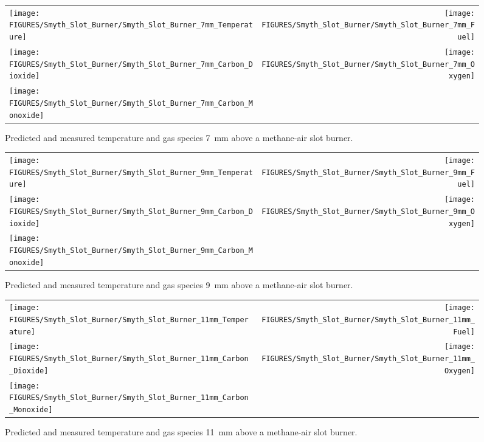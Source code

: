 \begin{figure}[p]
\begin{tabular*}{\textwidth}{l@{\extracolsep{\fill}}r}
\texttt{[image: FIGURES/Smyth\_Slot\_Burner/Smyth\_Slot\_Burner\_7mm\_Temperature]} &
\texttt{[image: FIGURES/Smyth\_Slot\_Burner/Smyth\_Slot\_Burner\_7mm\_Fuel]} \\
\texttt{[image: FIGURES/Smyth\_Slot\_Burner/Smyth\_Slot\_Burner\_7mm\_Carbon\_Dioxide]} &
\texttt{[image: FIGURES/Smyth\_Slot\_Burner/Smyth\_Slot\_Burner\_7mm\_Oxygen]} \\
\texttt{[image: FIGURES/Smyth\_Slot\_Burner/Smyth\_Slot\_Burner\_7mm\_Carbon\_Monoxide]} &
\end{tabular*}
\caption[Temperature and gas species predictions 7~mm above burner, Smyth experiment]
{Predicted and measured temperature and gas species 7~mm above a methane-air slot burner.}
\label{Smyth_Slot_Burner_7}
\end{figure}

\begin{figure}[p]
\begin{tabular*}{\textwidth}{l@{\extracolsep{\fill}}r}
\texttt{[image: FIGURES/Smyth\_Slot\_Burner/Smyth\_Slot\_Burner\_9mm\_Temperature]} &
\texttt{[image: FIGURES/Smyth\_Slot\_Burner/Smyth\_Slot\_Burner\_9mm\_Fuel]} \\
\texttt{[image: FIGURES/Smyth\_Slot\_Burner/Smyth\_Slot\_Burner\_9mm\_Carbon\_Dioxide]} &
\texttt{[image: FIGURES/Smyth\_Slot\_Burner/Smyth\_Slot\_Burner\_9mm\_Oxygen]} \\
\texttt{[image: FIGURES/Smyth\_Slot\_Burner/Smyth\_Slot\_Burner\_9mm\_Carbon\_Monoxide]} &
\end{tabular*}
\caption[Temperature and gas species predictions 9~mm above burner, Smyth experiment]
{Predicted and measured temperature and gas species 9~mm above a methane-air slot burner.}
\label{Smyth_Slot_Burner_9}
\end{figure}

\begin{figure}[p]
\begin{tabular*}{\textwidth}{l@{\extracolsep{\fill}}r}
\texttt{[image: FIGURES/Smyth\_Slot\_Burner/Smyth\_Slot\_Burner\_11mm\_Temperature]} &
\texttt{[image: FIGURES/Smyth\_Slot\_Burner/Smyth\_Slot\_Burner\_11mm\_Fuel]} \\
\texttt{[image: FIGURES/Smyth\_Slot\_Burner/Smyth\_Slot\_Burner\_11mm\_Carbon\_Dioxide]} &
\texttt{[image: FIGURES/Smyth\_Slot\_Burner/Smyth\_Slot\_Burner\_11mm\_Oxygen]} \\
\texttt{[image: FIGURES/Smyth\_Slot\_Burner/Smyth\_Slot\_Burner\_11mm\_Carbon\_Monoxide]} &
\end{tabular*}
\caption[Temperature and gas species predictions 11~mm above burner, Smyth experiment]
{Predicted and measured temperature and gas species 11~mm above a methane-air slot burner.}
\label{Smyth_Slot_Burner_11}
\end{figure}



